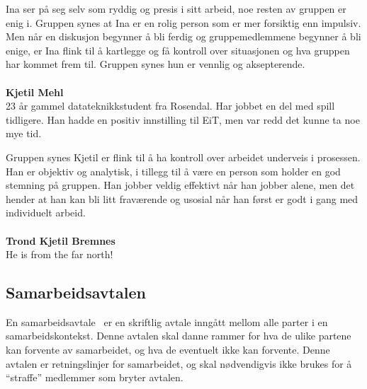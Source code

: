 Ina ser på seg selv som ryddig og presis i sitt arbeid, noe resten av
gruppen er enig i. Gruppen synes at Ina er en rolig person som er mer
forsiktig enn impulsiv. Men når en diskusjon begynner å bli ferdig og
gruppemedlemmene begynner å bli enige, er Ina flink til å kartlegge og
få kontroll over situasjonen og hva gruppen har kommet frem til. Gruppen
synes hun er vennlig og aksepterende.\\\\
\textbf{Kjetil Mehl}\\
23 år gammel datateknikkstudent fra Rosendal. Har jobbet en del med
spill tidligere. Han hadde en positiv innstilling til EiT, men var
redd det kunne ta noe mye tid.

Gruppen synes Kjetil er flink til å ha kontroll over arbeidet underveis
i prosessen. Han er objektiv og analytisk, i tillegg til å være en
person som holder en god stemning på gruppen. Han jobber veldig
effektivt når han jobber alene, men det hender at han kan bli litt
fraværende og usosial når han først er godt i gang med individuelt
arbeid. \\\\
\textbf{Trond Kjetil Bremnes}\\
He is from the far north! \\

\subsection{Samarbeidsavtalen}
En samarbeidsavtale~\cite{samarbeidsavtale} er en skriftlig avtale
inngått mellom alle parter i en samarbeidskontekst. Denne avtalen skal
danne rammer for hva de ulike partene kan forvente av samarbeidet, og
hva de eventuelt ikke kan forvente. Denne avtalen er retningslinjer for
samarbeidet, og skal nødvendigvis ikke brukes for å ``straffe''
medlemmer som bryter avtalen.

